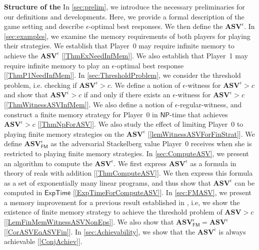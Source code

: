 \textbf{Structure of the \mydoc} In \cref{sec:prelim}, we introduce the necessary preliminaries for our definitions and developments. Here, we provide a formal description of the game setting and describe $\epsilon$-optimal best responses. We then define the $\mathbf{ASV}^{\epsilon}$. 
In \cref{sec:examples}, we examine the memory requirements of both players for playing their strategies. We establish that Player~0 may require infinite memory to achieve the $\mathbf{ASV}^{\epsilon}$ [\cref{ThmExNeedInfMem}]. We also establish that Player~1 may require infinite memory to play an $\epsilon$-optimal best response [\cref{ThmP1NeedInfMem}]. 
In \cref{sec:ThresholdProblem}, we consider the threshold problem, i.e. checking if $\mathbf{ASV}^{\epsilon} > c$. We define a notion of $\epsilon$-witness for $\mathbf{ASV}^{\epsilon} > c$ and show that $\mathbf{ASV}^{\epsilon} > c$ if and only if there exists an $\epsilon$-witness for $\mathbf{ASV}^{\epsilon} > c$ [\cref{ThmWitnessASVInfMem}]. We also define a notion of $\epsilon$-regular-witness, and construct a finite memory strategy for Player~0 in $\mathsf{NP}$-time that achieves $\mathbf{ASV}^{\epsilon} > c$ [\cref{ThmNpForASV}]. We also study the effect of limiting Player~0 to playing finite memory strategies on the $\mathbf{ASV}^{\epsilon}$ [\cref{lemWitnessASVForFinStrat}]. We define $\mathbf{ASV}^{\epsilon}_{\mathsf{FM}}$ as the adversarial Stackelberg value Player~0 receives when she is restricted to playing finite memory strategies.
In \cref{sec:ComputeASV}, we present an algorithm to compute the $\mathbf{ASV}^{\epsilon}$. We first express $\mathbf{ASV}^{\epsilon}$ as a formula in theory of reals with addition [\cref{ThmComputeASV}]. We then express this formula as a set of exponentially many linear programs, and thus show that $\mathbf{ASV}^{\epsilon}$ can be computed in $\mathsf{ExpTime}$ [\cref{ExpTimeForComputeASV}].
In \cref{sec:FMASV}, we present a memory improvement for a previous result established in \cite{FGR20}, i.e, we show the existence of finite memory strategy to achieve the threshold problem of $\mathbf{ASV} > c$ [\cref{LemFinMemWitnessASVNonEps}]. We also show that $\mathbf{ASV}^{\epsilon}_{\mathsf{FM}} = \mathbf{ASV}^{\epsilon}$ [\cref{CorASVEqASVFin}].
In \cref{sec:Achievability}, we show that the $\mathbf{ASV}^{\epsilon}$ is always achievable [\cref{ConjAchiev}].